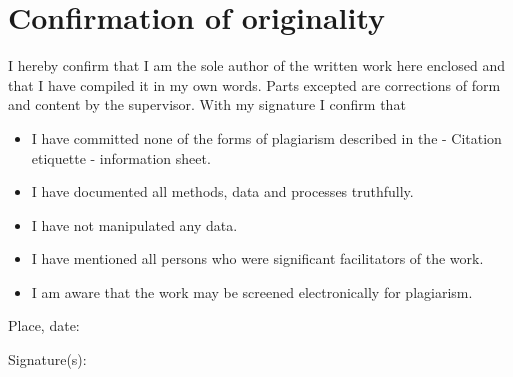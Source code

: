 











\section*{Confirmation of originality}




I hereby confirm that I am the sole author of the written work here enclosed and that I have compiled it in my own words. Parts excepted are corrections of form and content by the supervisor.
With my signature I confirm that
\begin{itemize}
\item 	I have committed none of the forms of plagiarism described in the - Citation etiquette -  information sheet.
\item 	I have documented all methods, data and processes truthfully.
\item 	I have not manipulated any data.
\item 	I have mentioned all persons who were significant facilitators of the work.
\item 	I am aware that the work may be screened electronically for plagiarism.
\end{itemize}



Place, date:

\hskip 10pt

Signature(s):

\hskip 10pt

